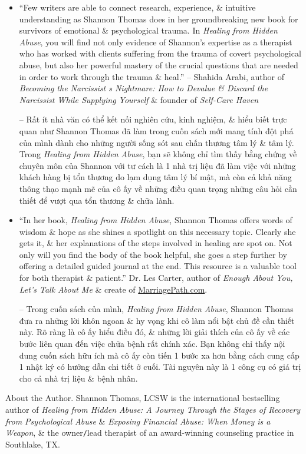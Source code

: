 \documentclass{article}
\begin{document}
\begin{enumerate}
\begin{itemize}
		\item ``Few writers are able to connect research, experience, \& intuitive understanding as {\sc Shannon Thomas} does in her groundbreaking new book for survivors of emotional \& psychological trauma. In {\it Healing from Hidden Abuse}, you will find not only evidence of {\sc Shannon}'s expertise as a therapist who has worked with clients suffering from the trauma of covert psychological abuse, but also her powerful mastery of the crucial questions that are needed in order to work through the trauma \& heal.'' -- {\sc Shahida Arabi}, author of {\it Becoming the Narcissist s Nightmare: How to Devalue \& Discard the Narcissist While Supplying Yourself} \& founder of {\it Self-Care Haven}

		-- Rất ít nhà văn có thể kết nối nghiên cứu, kinh nghiệm, \& hiểu biết trực quan như {\sc Shannon Thomas} đã làm trong cuốn sách mới mang tính đột phá của mình dành cho những người sống sót sau chấn thương tâm lý \& tâm lý. Trong {\it Healing from Hidden Abuse}, bạn sẽ không chỉ tìm thấy bằng chứng về chuyên môn của {\sc Shannon} với tư cách là 1 nhà trị liệu đã làm việc với những khách hàng bị tổn thương do lạm dụng tâm lý bí mật, mà còn cả khả năng thông thạo mạnh mẽ của cô ấy về những điều quan trọng những câu hỏi cần thiết để vượt qua tổn thương \& chữa lành.

		\item ``In her book, {\it Healing from Hidden Abuse}, {\sc Shannon Thomas} offers words of wisdom \& hope as she shines a spotlight on this necessary topic. Clearly she gets it, \& her explanations of the steps involved in healing are spot on. Not only will you find the body of the book helpful, she goes a step further by offering a detailed guided journal at the end. This resource is a valuable tool for both therapist \& patient.'' Dr. {\sc Les Carter}, author of {\it Enough About You, Let's Talk About Me} \& create of \url{MarriagePath.com}.

		-- Trong cuốn sách của mình, {\it Healing from Hidden Abuse}, {\sc Shannon Thomas} đưa ra những lời khôn ngoan \& hy vọng khi cô làm nổi bật chủ đề cần thiết này. Rõ ràng là cô ấy hiểu điều đó, \& những lời giải thích của cô ấy về các bước liên quan đến việc chữa bệnh rất chính xác. Bạn không chỉ thấy nội dung cuốn sách hữu ích mà cô ấy còn tiến 1 bước xa hơn bằng cách cung cấp 1 nhật ký có hướng dẫn chi tiết ở cuối. Tài nguyên này là 1 công cụ có giá trị cho cả nhà trị liệu \& bệnh nhân.
	\end{itemize}
	{\sf About the Author.} {\sc Shannon Thomas, LCSW} is the international bestselling author of {\it Healing from Hidden Abuse: A Journey Through the Stages of Recovery from Psychological Abuse} \& {\it Exposing Financial Abuse: When Money is a Weapon}, \& the owner{\tt/}lead therapist of an award-winning counseling practice in Southlake, TX.


\end{enumerate}
\end{document}
